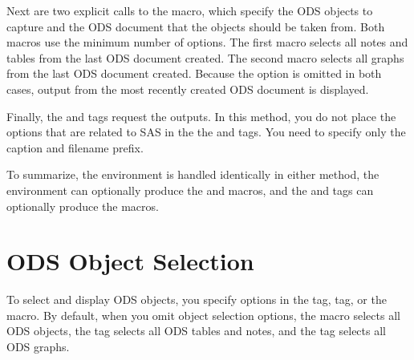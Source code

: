 \documentclass[article,oneside]{memoir}
\begin{document}
  Next are two explicit calls to the  macro, which
  specify the ODS objects to capture and the ODS document that the objects 
  should be taken from. 
  Both  macros use the minimum number of options.
  The first  macro selects all
  notes and tables from the last ODS document created. The second  macro
  selects all graphs from the last ODS document created.
  Because the  option is omitted in both cases,
  output from the most recently created ODS document is displayed.
  
  Finally, the  and  tags request the outputs.
  In
  this method, you do not place the options that are related to SAS in the 
  the  and  tags. You need to
  specify only the caption and filename prefix.
 
  
  To summarize, the  environment is handled identically in either method,
  the  environment can optionally produce the  and  macros,
  and the  and  tags can optionally produce the  macros.


 \section{ODS Object Selection}\label{selection}
To select and display ODS objects, you specify options in the  tag, 
  tag, or the  macro. 
\label{optionopt}
By default, when you omit object selection options, the  macro selects all ODS objects,
the  tag selects all ODS tables and notes, and the  tag selects all ODS graphs. 
  
\end{document}
